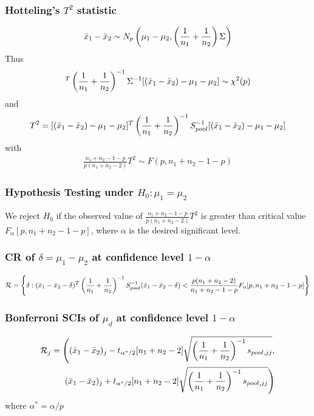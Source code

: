 \documentclass[12pt]{extarticle}
\newcommand{\<}{\langle}
\renewcommand{\>}{\rangle}
\theoremstyle{definition}
\begin{document}
\subsubsection{Hotteling's $T^2$ statistic}
\begin{eqnarray*}
\Bar{x}_1 - \Bar{x}_2 \sim N_p \left( \mu_1 - \mu_2, \left( \frac{1}{n_1} + \frac{1}{n_2} \right) \Sigma \right)
\end{eqnarray*}
Thus
\begin{eqnarray*}
[(\Bar{x}_1 - \Bar{x}_2) - \mu_1 - \mu_2]^T \left( \frac{1}{n_1} + \frac{1}{n_2} \right)^{-1} \Sigma^{-1} [(\Bar{x}_1 - \Bar{x}_2) - \mu_1 - \mu_2] \sim \chi^2(p)
\end{eqnarray*}
and
\begin{eqnarray*}
T^2 = [(\Bar{x}_1 - \Bar{x}_2) - \mu_1 - \mu_2]^T \left( \frac{1}{n_1} + \frac{1}{n_2} \right)^{-1} S_{pool}^{-1} [(\Bar{x}_1 - \Bar{x}_2) - \mu_1 - \mu_2]
\end{eqnarray*}
with
\begin{eqnarray*}
\frac{n_1 + n_2 - 1 - p}{p(n_1 + n_2 -2)}
T^2 \sim F(p, n_1 + n_2 -1-p)
\end{eqnarray*}

\newpage
\subsubsection{Hypothesis Testing under $H_0: \mu_1 = \mu_2$}
We reject $H_0$ if the observed value of $\frac{n_1 + n_2 -1-p}{p(n_1 + n_2 -2)}T^2$ is greater than critical value $F_{\alpha} [p, n_1 + n_2 -1-p]$, where $\alpha$ is the desired significant level.\\

\subsubsection{CR of $\delta = \mu_1 - \mu_2$ at confidence level $1-\alpha$}
\begin{eqnarray*}
\mathcal{R} = \left\{ \delta : (\Bar{x}_1 - \Bar{x}_2 -\delta)^T \left( \frac{1}{n_1}+\frac{1}{n_2} \right)^{-1} S^{-1}_{pool} (\Bar{x}_1 - \Bar{x}_2 -\delta) < \frac{p(n_1 + n_2 -2)}{n_1 + n_2 -1-p} F_{\alpha}[p, n_1 + n_2 -1-p] \right\}
\end{eqnarray*}

\subsubsection{Bonferroni SCIs of $\mu_d$ at confidence level $1-\alpha$}
\begin{eqnarray*}
\mathcal{R}_j = \Bigg( (\Bar{x}_1 - \Bar{x}_2)_j - t_{\alpha^*/2}[n_1 + n_2 -2] \sqrt{\left( \frac{1}{n_1}+\frac{1}{n_2} \right)^{-1} s_{pool,jj}}, \\
(\Bar{x}_1 - \Bar{x}_2)_j + t_{\alpha^*/2}[n_1 + n_2 -2] \sqrt{\left( \frac{1}{n_1}+\frac{1}{n_2} \right)^{-1} s_{pool,jj}} \Bigg)
\end{eqnarray*}
where $\alpha^* = \alpha/p$
\end{document}
